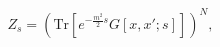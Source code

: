 \begin{equation}
   Z_s=\left(\mbox{Tr}\left[e^{-\frac{m^2}{2} s} G[x,x';s]\right]\right)^N, 
   \end{equation}

